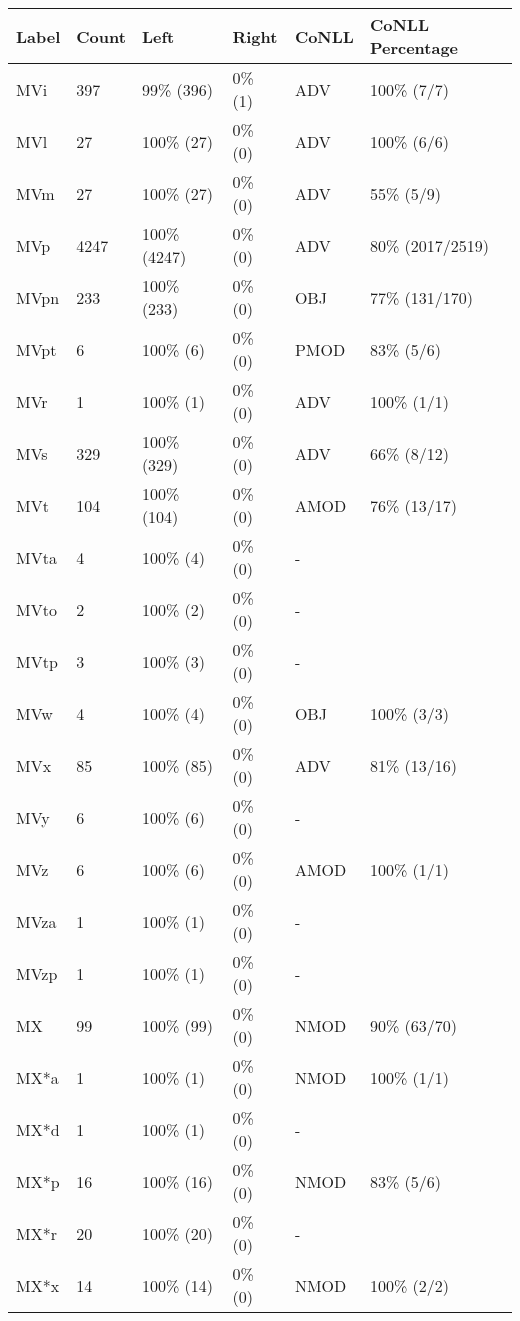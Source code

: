 \begin{figure*}
\begin{tabular}{|l|l|l|l||l|l|}
\hline
Label & Count & Left & Right & CoNLL & CoNLL Percentage\\ 
\hline
 MVi & 397 & 99\% (396) & 0\% (1) & ADV & 100\% (7/7) \\ 
\hline
 MVl & 27 & 100\% (27) & 0\% (0) & ADV & 100\% (6/6) \\ 
\hline
 MVm & 27 & 100\% (27) & 0\% (0) & ADV & 55\% (5/9) \\ 
\hline
 MVp & 4247 & 100\% (4247) & 0\% (0) & ADV & 80\% (2017/2519) \\ 
\hline
 MVpn & 233 & 100\% (233) & 0\% (0) & OBJ & 77\% (131/170) \\ 
\hline
 MVpt & 6 & 100\% (6) & 0\% (0) & PMOD & 83\% (5/6) \\ 
\hline
 MVr & 1 & 100\% (1) & 0\% (0) & ADV & 100\% (1/1) \\ 
\hline
 MVs & 329 & 100\% (329) & 0\% (0) & ADV & 66\% (8/12) \\ 
\hline
 MVt & 104 & 100\% (104) & 0\% (0) & AMOD & 76\% (13/17) \\ 
\hline
 MVta & 4 & 100\% (4) & 0\% (0) & - &  \\ 
\hline
 MVto & 2 & 100\% (2) & 0\% (0) & - &  \\ 
\hline
 MVtp & 3 & 100\% (3) & 0\% (0) & - &  \\ 
\hline
 MVw & 4 & 100\% (4) & 0\% (0) & OBJ & 100\% (3/3) \\ 
\hline
 MVx & 85 & 100\% (85) & 0\% (0) & ADV & 81\% (13/16) \\ 
\hline
 MVy & 6 & 100\% (6) & 0\% (0) & - &  \\ 
\hline
 MVz & 6 & 100\% (6) & 0\% (0) & AMOD & 100\% (1/1) \\ 
\hline
 MVza & 1 & 100\% (1) & 0\% (0) & - &  \\ 
\hline
 MVzp & 1 & 100\% (1) & 0\% (0) & - &  \\ 
\hline
 MX & 99 & 100\% (99) & 0\% (0) & NMOD & 90\% (63/70) \\ 
\hline
 MX*a & 1 & 100\% (1) & 0\% (0) & NMOD & 100\% (1/1) \\ 
\hline
 MX*d & 1 & 100\% (1) & 0\% (0) & - &  \\ 
\hline
 MX*p & 16 & 100\% (16) & 0\% (0) & NMOD & 83\% (5/6) \\ 
\hline
 MX*r & 20 & 100\% (20) & 0\% (0) & - &  \\ 
\hline
 MX*x & 14 & 100\% (14) & 0\% (0) & NMOD & 100\% (2/2) \\ 

\end{tabular}
\end{figure*}
